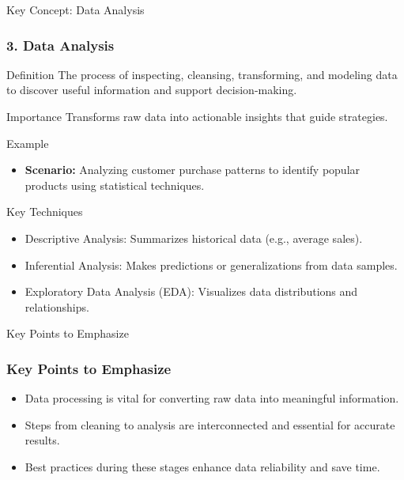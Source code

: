 \documentclass[aspectratio=169]{beamer}
\begin{document}
\begin{frame}{Key Concept: Data Analysis}
    \frametitle{3. Data Analysis}
    \begin{block}{Definition}
        The process of inspecting, cleansing, transforming, and modeling data to discover useful information and support decision-making.
    \end{block}
    
    \begin{block}{Importance}
        Transforms raw data into actionable insights that guide strategies.
    \end{block}
    
    \begin{block}{Example}
        \begin{itemize}
            \item \textbf{Scenario:} Analyzing customer purchase patterns to identify popular products using statistical techniques.
        \end{itemize}
    \end{block}
    
    \begin{block}{Key Techniques}
        \begin{itemize}
            \item Descriptive Analysis: Summarizes historical data (e.g., average sales).
            \item Inferential Analysis: Makes predictions or generalizations from data samples.
            \item Exploratory Data Analysis (EDA): Visualizes data distributions and relationships.
        \end{itemize}
    \end{block}
\end{frame}

\begin{frame}[fragile]{Key Points to Emphasize}
    \frametitle{Key Points to Emphasize}
    \begin{itemize}
        \item Data processing is vital for converting raw data into meaningful information.
        \item Steps from cleaning to analysis are interconnected and essential for accurate results.
        \item Best practices during these stages enhance data reliability and save time.
    \end{itemize}
\end{frame}
\end{document}
